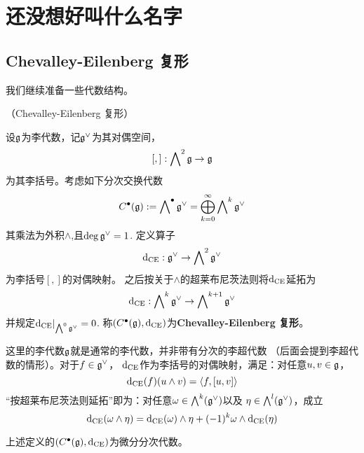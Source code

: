 
\chapter{还没想好叫什么名字}

\section{Chevalley-Eilenberg 复形}
我们继续准备一些代数结构。
\begin{definition}（Chevalley-Eilenberg 复形）

设$\mathfrak{g}$为李代数，记$\mathfrak{g}^\vee$为其对偶空间，
$$[,]:\bigwedge\nolimits^{2}\mathfrak{g}\to\mathfrak{g}$$
为其李括号。考虑如下分次交换代数
$$C^{\bullet}(\mathfrak{g}):=\bigwedge\nolimits^{\bullet}\mathfrak{g}^\vee
=\bigoplus_{k=0}^\infty\bigwedge\nolimits^{k}\mathfrak{g}^\vee$$
其乘法为外积$\wedge$,且$\deg\mathfrak{g}^\vee =1$.
定义算子
$$\mathrm{d}_{\operatorname{CE}}:\mathfrak{g}^\vee\to\bigwedge\nolimits^{2}\mathfrak{g}^\vee$$
为李括号$[,]$的对偶映射。
之后按关于$\wedge$的超莱布尼茨法则将$\mathrm{d}_{\operatorname{CE}}$延拓为
$$\mathrm{d}_{\operatorname{CE}}:\bigwedge\nolimits^{k}\mathfrak{g}^\vee\to\bigwedge\nolimits^{k+1}\mathfrak{g}^\vee$$
并规定$\mathrm{d}_{\operatorname{CE}}|_{\bigwedge\nolimits^{0}\mathfrak{g}^\vee}=0$.
称$(C^{\bullet}(\mathfrak{g}),\mathrm{d}_{\operatorname{CE}})$为\textbf{Chevalley-Eilenberg 复形}。
\label{Chevalley-Elienberg复形-李代数版本-def}
\end{definition}



这里的李代数$\mathfrak{g}$就是通常的李代数，并非带有分次的李超代数
（后面会提到李超代数的情形）。对于$f\in\mathfrak{g}^\vee$，
$\mathrm{d}_{\operatorname{CE}}$作为李括号的对偶映射，满足：对任意$u,v\in\mathfrak{g}$，
$$\mathrm{d}_{\operatorname{CE}}(f)(u\wedge v)=\langle f,[u,v] \rangle$$
“按超莱布尼茨法则延拓”即为：对任意$\omega\in\bigwedge\nolimits^{k}(\mathfrak{g}^\vee)$以及
$\eta\in\bigwedge\nolimits^{l}(\mathfrak{g}^\vee)$，成立
$$
  \mathrm{d}_{\operatorname{CE}}(\omega\wedge\eta)
= \mathrm{d}_{\operatorname{CE}}(\omega)\wedge\eta
 +(-1)^{k}\omega\wedge\mathrm{d}_{\operatorname{CE}}(\eta)
$$

\begin{prop}
上述定义的$(C^{\bullet}(\mathfrak{g}),\mathrm{d}_{\operatorname{CE}})$为微分分次代数。
\label{Chevalley-Elienberg复形-微分分次代数-prop}
\end{prop}

